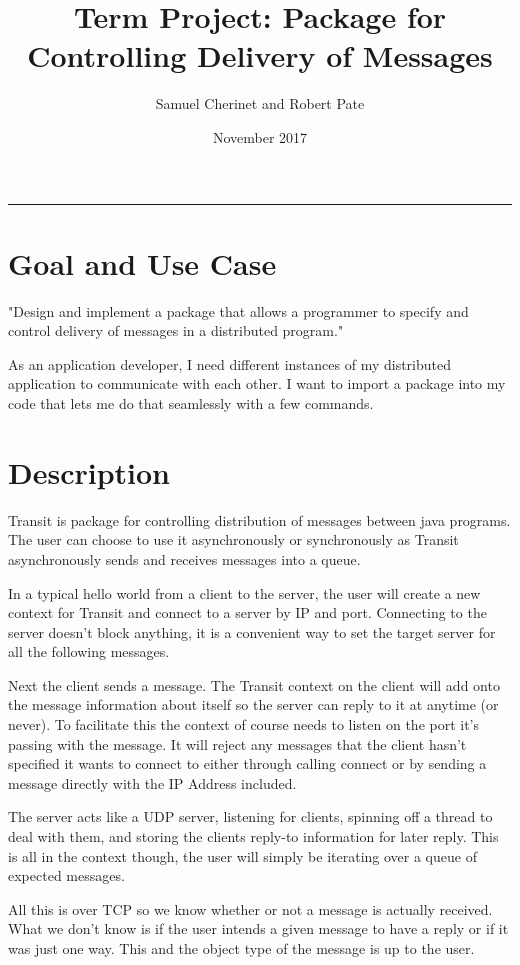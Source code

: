 \documentclass[twoside]{article}
\title{Term Project: Package for Controlling Delivery of Messages}
\author{Samuel Cherinet and Robert Pate }
\date{November 2017}
\newcommand{\HRule}{\rule{\linewidth}{0.4mm}}
\begin{document}
\maketitle
\HRule

\section{Goal and Use Case}

"Design and implement a package that allows a programmer to specify and control delivery of messages in a distributed program."

As an application developer, I need different instances of my distributed application to communicate with each other. I want to import a package into my code that lets me do that seamlessly with a few commands.

\section{Description}

Transit is package for controlling distribution of messages between java programs. The user can choose to use it asynchronously or synchronously as Transit asynchronously sends and receives messages into a queue.

In a typical hello world from a client to the server, the user will create a new context for Transit and connect to a server by IP and port. Connecting to the server doesn't block anything, it is a convenient way to set the target server for all the following messages. 
 
Next the client sends a message. The Transit context on the client will add onto the message information about itself so the server can reply to it at anytime (or never). To facilitate this the context of course needs to listen on the port it's passing with the message. It will reject any messages that the client hasn't specified it wants to connect to either through calling connect or by sending a message directly with the IP Address included.

The server acts like a UDP server, listening for clients, spinning off a thread to deal with them, and storing the clients reply-to information for later reply. This is all in the context though, the user will simply be iterating over a queue of expected messages.

All this is over TCP so we know whether or not a message is actually received. What we don't know is if the user intends a given message to have a reply or if it was just one way. This and the object type of the message is up to the user.
\end{document}

